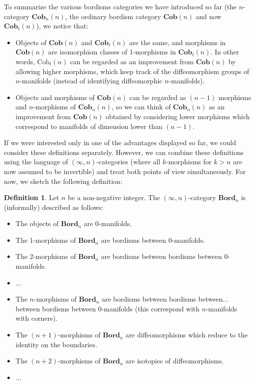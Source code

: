 \documentclass[a4paper,11pt]{article}
\theoremstyle{plain}
\theoremstyle{definition}
\newtheorem{defi}[thm]{Definition}
\theoremstyle{remark}
\begin{document}
To summarize the various bordisms categories we have introduced so far (the $n$-category $\textbf{Cob}_n(n)$, the ordinary bordism category $\textbf{Cob}(n)$ and now $\textbf{Cob}_t(n)$), we notice that:
\begin{itemize}
    \item Objects of $\textbf{Cob}(n)$ and $\textbf{Cob}_t(n)$ are the same, and morphisms in $\textbf{Cob}(n)$ are isomorphism classes of 1-morphisms in $\textbf{Cob}_t(n)$. In other words, $\text{Cob}_t(n)$ can be regarded as an improvement from $\textbf{Cob}(n)$ by allowing higher morphisms, which keep track of the diffeomorphism groups of $n$-manifolds (instead of identifying diffeomorphic $n$-manifolds).
    \item Objects and morphisms of $\textbf{Cob}(n)$ can be regarded as $(n-1)$ morphisms and $n$-morphisms of $\textbf{Cob}_n(n)$, so we can think of $\textbf{Cob}_n(n)$ as an improvement from $\textbf{Cob}(n)$ obtained by considering lower morphisms which correspond to manifolds of dimension lower than $(n-1)$. 
\end{itemize}

If we were interested only in one of the advantages displayed so far, we could consider these definitions separately. However, we can combine these definitions using the language of $(\infty, n)$-categories (where all $k$-morphisms for $k>n$ are now assumed to be invertible) and treat both points of view simultaneously. For now, we sketch the following definition: 

\begin{defi}
\label{infinity_n_bordism}
Let $n$ be a non-negative integer. The $(\infty, n)$-category $\textbf{Bord}_n$ is (informally) described as follows:
\begin{itemize}
    \item The objects of $\textbf{Bord}_n$ are 0-manifolds. 
    \item The 1-morphisms of $\textbf{Bord}_n$ are bordisms between 0-manifolds. 
    \item The 2-morphisms of $\textbf{Bord}_n$ are bordisms between bordisms between 0-manifolds. 
    \item ...
    \item The $n$-morphisms of $\textbf{Bord}_n$ are bordisms between bordisms between... between bordisms between 0-manifolds (this correspond with $n$-manifolds with corners). 
    \item The $(n+1)$-morphisms of $\textbf{Bord}_n$ are diffeomorphisms which reduce to the identity on the boundaries.
    \item The $(n+2)$-morphisms of $\textbf{Bord}_n$ are isotopies of diffeomorphisms.
    \item ...
\end{itemize}
\end{defi}
\end{document}
